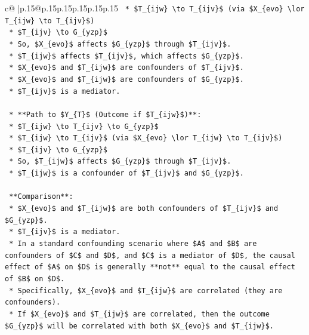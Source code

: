 \documentclass{article}
\begin{document}
{\begin{supertabular}{c@{$\;$}|p{.15\linewidth}@{}p{.15\linewidth}p{.15\linewidth}p{.15\linewidth}p{.15\linewidth}p{.15\linewidth}}
{{{\texttt{        *   \$T\_\{ijw\} \textbackslash{}to T\_\{ijv\}\$ (via \$X\_\{evo\} \textbackslash{}lor T\_\{ijw\} \textbackslash{}to T\_\{ijv\}\$)} \\
\texttt{        *   \$T\_\{ijv\} \textbackslash{}to G\_\{yzp\}\$} \\
\texttt{        *   So, \$X\_\{evo\}\$ affects \$G\_\{yzp\}\$ through \$T\_\{ijv\}\$.} \\
\texttt{        *   \$T\_\{ijw\}\$ affects \$T\_\{ijv\}\$, which affects \$G\_\{yzp\}\$.} \\
\texttt{        *   \$X\_\{evo\}\$ and \$T\_\{ijw\}\$ are confounders of \$T\_\{ijv\}\$.} \\
\texttt{        *   \$X\_\{evo\}\$ and \$T\_\{ijw\}\$ are confounders of \$G\_\{yzp\}\$.} \\
\texttt{        *   \$T\_\{ijv\}\$ is a mediator.} \\
\\ 
\texttt{    *   **Path to \$Y\_\{T\}\$ (Outcome if \$T\_\{ijw\}\$)**:} \\
\texttt{        *   \$T\_\{ijw\} \textbackslash{}to T\_\{ijv\} \textbackslash{}to G\_\{yzp\}\$} \\
\texttt{        *   \$T\_\{ijw\} \textbackslash{}to T\_\{ijv\}\$ (via \$X\_\{evo\} \textbackslash{}lor T\_\{ijw\} \textbackslash{}to T\_\{ijv\}\$)} \\
\texttt{        *   \$T\_\{ijv\} \textbackslash{}to G\_\{yzp\}\$} \\
\texttt{        *   So, \$T\_\{ijw\}\$ affects \$G\_\{yzp\}\$ through \$T\_\{ijv\}\$.} \\
\texttt{        *   \$T\_\{ijw\}\$ is a confounder of \$T\_\{ijv\}\$ and \$G\_\{yzp\}\$.} \\
\\ 
\texttt{    **Comparison**:} \\
\texttt{    *   \$X\_\{evo\}\$ and \$T\_\{ijw\}\$ are both confounders of \$T\_\{ijv\}\$ and \$G\_\{yzp\}\$.} \\
\texttt{    *   \$T\_\{ijv\}\$ is a mediator.} \\
\texttt{    *   In a standard confounding scenario where \$A\$ and \$B\$ are confounders of \$C\$ and \$D\$, and \$C\$ is a mediator of \$D\$, the causal effect of \$A\$ on \$D\$ is generally **not** equal to the causal effect of \$B\$ on \$D\$.} \\
\texttt{    *   Specifically, \$X\_\{evo\}\$ and \$T\_\{ijw\}\$ are correlated (they are confounders).} \\
\texttt{    *   If \$X\_\{evo\}\$ and \$T\_\{ijw\}\$ are correlated, then the outcome \$G\_\{yzp\}\$ will be correlated with both \$X\_\{evo\}\$ and \$T\_\{ijw\}\$.} \\
}}}
\end{supertabular}}
\end{document}
